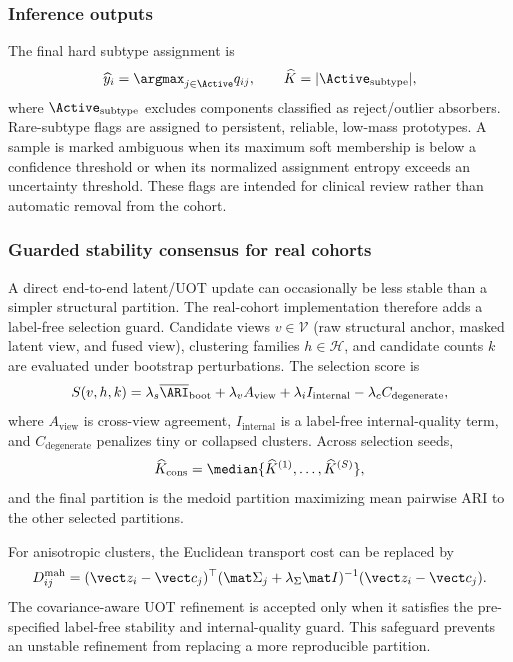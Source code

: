 \subsubsection{Inference outputs}
The final hard subtype assignment is
\begin{equation}
 \widehat y_i=\argmax_{j\in\Active}q_{ij},
 \qquad
 \widehat K=|\Active_{\mathrm{subtype}}|,
\label{eq:inference}
\end{equation}
where $\Active_{\mathrm{subtype}}$ excludes components classified as reject/outlier absorbers. Rare-subtype flags are assigned to persistent, reliable, low-mass prototypes. A sample is marked ambiguous when its maximum soft membership is below a confidence threshold or when its normalized assignment entropy exceeds an uncertainty threshold. These flags are intended for clinical review rather than automatic removal from the cohort.

\subsubsection{Guarded stability consensus for real cohorts}
A direct end-to-end latent/UOT update can occasionally be less stable than a simpler structural partition. The real-cohort implementation therefore adds a label-free selection guard. Candidate views $v\in\mathcal V$ (raw structural anchor, masked latent view, and fused view), clustering families $h\in\mathcal H$, and candidate counts $k$ are evaluated under bootstrap perturbations. The selection score is
\begin{equation}
S(v,h,k)=\lambda_s\overline{\ARI}_{\mathrm{boot}}+
\lambda_v A_{\mathrm{view}}+
\lambda_i I_{\mathrm{internal}}-
\lambda_c C_{\mathrm{degenerate}},
\label{eq:stability_score}
\end{equation}
where $A_{\mathrm{view}}$ is cross-view agreement, $I_{\mathrm{internal}}$ is a label-free internal-quality term, and $C_{\mathrm{degenerate}}$ penalizes tiny or collapsed clusters. Across selection seeds,
\begin{equation}
 \widehat K_{\mathrm{cons}}=
 \median\{\widehat K^{(1)},\ldots,\widehat K^{(S)}\},
\label{eq:consensus_k}
\end{equation}
and the final partition is the medoid partition maximizing mean pairwise ARI to the other selected partitions.

For anisotropic clusters, the Euclidean transport cost can be replaced by
\begin{equation}
D^{\mathrm{mah}}_{ij}=(\vect z_i-\vect c_j)^{\top}
(\mat\Sigma_j+\lambda_{\Sigma}\mat I)^{-1}
(\vect z_i-\vect c_j).
\label{eq:mahalanobis_cost}
\end{equation}
The covariance-aware UOT refinement is accepted only when it satisfies the pre-specified label-free stability and internal-quality guard. This safeguard prevents an unstable refinement from replacing a more reproducible partition.

